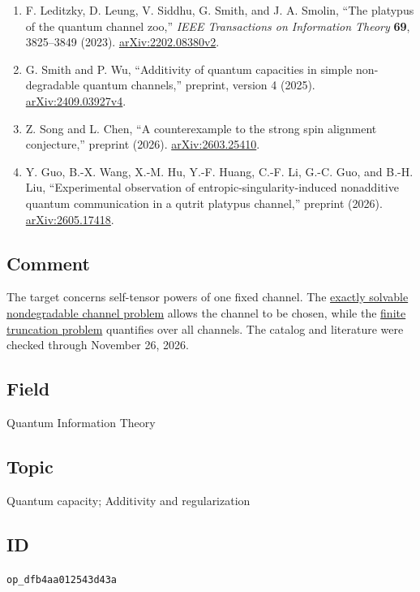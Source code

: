 \begin{enumerate}[label={},leftmargin=4.8em,labelsep=0.5em]
  \footnotesize
  \item[\textup{[LLSSS23]}]\label{ref:spq-leditzky}
  F. Leditzky, D. Leung, V. Siddhu, G. Smith, and J. A. Smolin, ``The platypus of the quantum channel zoo,'' \emph{IEEE Transactions on Information Theory} \textbf{69}, 3825--3849 (2023). \href{https://arxiv.org/abs/2202.08380v2}{arXiv:2202.08380v2}.

  \item[\textup{[SW25]}]\label{ref:spq-smith-wu}
  G. Smith and P. Wu, ``Additivity of quantum capacities in simple non-degradable quantum channels,'' preprint, version 4 (2025). \href{https://arxiv.org/abs/2409.03927v4}{arXiv:2409.03927v4}.

  \item[\textup{[SC26]}]\label{ref:spq-song-chen}
  Z. Song and L. Chen, ``A counterexample to the strong spin alignment conjecture,'' preprint (2026). \href{https://arxiv.org/abs/2603.25410}{arXiv:2603.25410}.

  \item[\textup{[Guo26]}]\label{ref:spq-guo}
  Y. Guo, B.-X. Wang, X.-M. Hu, Y.-F. Huang, C.-F. Li, G.-C. Guo, and B.-H. Liu, ``Experimental observation of entropic-singularity-induced nonadditive quantum communication in a qutrit platypus channel,'' preprint (2026). \href{https://arxiv.org/abs/2605.17418}{arXiv:2605.17418}.
\end{enumerate}

\subsection*{Comment}

The target concerns self-tensor powers of one fixed channel. The \href{https://qiqc-op.com/problem/op_a59d7cc1c843edb5/}{exactly solvable nondegradable channel problem} allows the channel to be chosen, while the \href{https://qiqc-op.com/problem/op_3ea0de34a1fe6e0b/}{finite truncation problem} quantifies over all channels. The catalog and literature were checked through November 26, 2026.

\subsection*{Field}

Quantum Information Theory

\subsection*{Topic}

Quantum capacity; Additivity and regularization

\subsection*{ID}

\texttt{op\_dfb4aa012543d43a}
